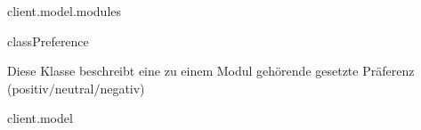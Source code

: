 \begin{texdocpackage}{client.model.modules}
\begin{texdocclass}{class}{Preference}
\label{texdoclet:edu.kit.informatik.studyplan.client.model.modules.Preference}
\begin{texdocclassintro}
Diese Klasse beschreibt eine zu einem Modul gehörende gesetzte Präferenz
 (positiv$/$neutral$/$negativ)\end{texdocclassintro}
\begin{texdocclassconstructors}
\end{texdocclassconstructors}
\begin{texdocclassmethods}
\end{texdocclassmethods}
\end{texdocclass}


\end{texdocpackage}



\begin{texdocpackage}{client.model}
\label{texdoclet:edu.kit.informatik.studyplan.client.model}

\end{texdocpackage}



